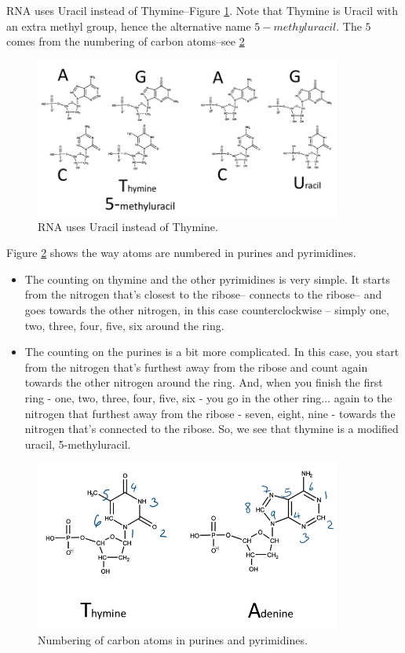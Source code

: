 \documentclass[]{article}
\begin{document}
RNA uses Uracil instead of Thymine--Figure \ref{fig:NucleotideDNARNAThymineUracil}. Note that Thymine is Uracil with an extra methyl group, hence the alternative name $5-methyluracil$. The $5$ comes from the numbering of carbon atoms--see \ref{fig:NucleotidesCounting}
	
\begin{figure}[H]
	\caption{RNA uses Uracil instead of Thymine.} \label{fig:NucleotideDNARNAThymineUracil} 
	\includegraphics[width=0.9\textwidth]{NucleotideDNARNAThymineUracil}
\end{figure}

Figure \ref{fig:NucleotidesCounting} shows the way atoms are numbered in purines and pyrimidines.\begin{itemize}
	\item The counting on thymine
	and the other pyrimidines is very simple.
	It starts from the nitrogen
	that's closest to the ribose--
	connects to the ribose--
	and goes towards the other nitrogen,
	in this case counterclockwise --
	simply one, two, three, four, five, six
	around the ring.
	\item The counting on the purines
	is a bit more complicated.
	In this case, you start from the nitrogen
	that's furthest away from the ribose
	and count again towards
	the other nitrogen around the ring.
	And, when you finish the first ring -
	one, two, three, four, five, six -
	you go in the other ring...
	again to the nitrogen
	that furthest away from the ribose -
	seven, eight, nine -
	towards the nitrogen
	that's connected to the ribose.
	So, we see that
	thymine is a modified uracil,
	5-methyluracil.
\end{itemize}
\begin{figure}[H]
	\caption{Numbering of carbon atoms in purines and pyrimidines. }\label{fig:NucleotidesCounting} 
	\includegraphics[width=0.9\textwidth]{NucleotidesCounting}
\end{figure}
\end{document}
